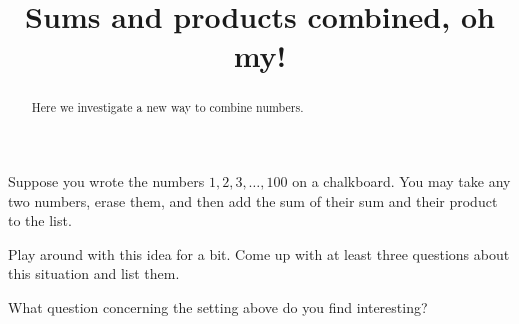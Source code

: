 \documentclass[handout,nooutcomes,space]{ximera}
\title{Sums and products combined, oh my!}
\begin{document}
\begin{abstract}
Here we investigate a new way to combine numbers.
\end{abstract}
\maketitle

Suppose you wrote the numbers $1,2,3,\dots,100$ on a chalkboard. You
may take any two numbers, erase them, and then add the sum of their
sum and their product to the list.

\begin{problem}
Play around with this idea for a bit. Come up with at least three
questions about this situation and list them.
\begin{freeResponse}
\end{freeResponse}
\end{problem}

\begin{problem}
What question concerning the setting above do you find interesting?
\begin{freeResponse}
\end{freeResponse}
\end{problem}
\end{document}

